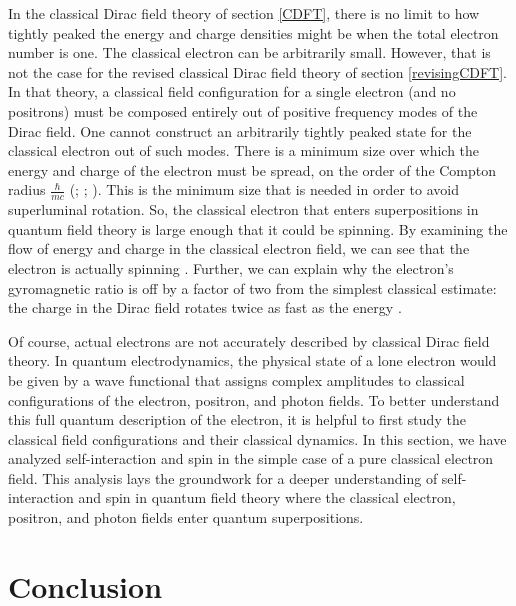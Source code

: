 \documentclass[onecolumn,secnumarabic,amsmath,amssymb,balancelastpage,nofootinbib]{article}
\begin{document}
In the classical Dirac field theory of section \ref{CDFT}, there is no limit to how tightly peaked the energy and charge densities might be when the total electron number is one.  The classical electron can be arbitrarily small.  However, that is not the case for the revised classical Dirac field theory of section \ref{revisingCDFT}.  In that theory, a classical field configuration for a single electron (and no positrons) must be composed entirely out of positive frequency modes of the Dirac field.  One cannot construct an arbitrarily tightly peaked state for the classical electron out of such modes.  There is a minimum size over which the energy and charge of the electron must be spread, on the order of the Compton radius $\frac{\hbar}{m c}$ (\citealp{newton1949}; \citealp[pg.\ 299]{heitler}; \citealp[pg.\ 39]{bjorkendrell}).  This is the minimum size that is needed in order to avoid superluminal rotation.  So, the classical electron that enters superpositions in quantum field theory is large enough that it could be spinning.  By examining the flow of energy and charge in the classical electron field, we can see that the electron is actually spinning \citep{ohanian, chuu2007, howelectronsspin}.  Further, we can explain why the electron's gyromagnetic ratio is off by a factor of two from the simplest classical estimate: the charge in the Dirac field rotates twice as fast as the energy \citep{howelectronsspin}.

Of course, actual electrons are not accurately described by classical Dirac field theory.  In quantum electrodynamics, the physical state of a lone electron would be given by a wave functional that assigns complex amplitudes to classical configurations of the electron, positron, and photon fields.  To better understand this full quantum description of the electron, it is helpful to first study the classical field configurations and their classical dynamics.  In this section, we have analyzed self-interaction and spin in the simple case of a pure classical electron field.  This analysis lays the groundwork for a deeper understanding of self-interaction and spin in quantum field theory where the classical electron, positron, and photon fields enter quantum superpositions.






\section{Conclusion}
\end{document}

